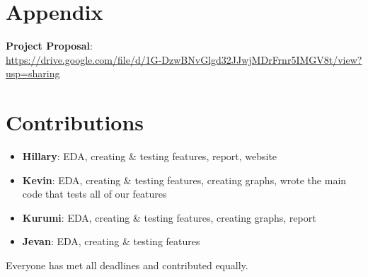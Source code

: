 \documentclass[12pt,letterpaper]{article}
\begin{document}
\clearpage

\makereference



\cite{plawiak2020dghnl}
\cite{radford2019gpt2}
\cite{vaswani2023attention}

\clearpage
\section{Appendix}

\begin{center}
\textbf{Project Proposal}: \\
\url{https://drive.google.com/file/d/1G-DzwBNvGlgd32JJwjMDrFrnr5IMGV8t/view?usp=sharing}
\end{center}


\section{Contributions}
\begin{itemize}
    \item \textbf{Hillary}: EDA, creating \& testing features, report, website
    \item \textbf{Kevin}: EDA, creating \& testing features, creating graphs, wrote the main code that tests all of our features
    \item \textbf{Kurumi}: EDA, creating \& testing features, creating graphs, report
    \item \textbf{Jevan}: EDA, creating \& testing features
\end{itemize}

Everyone has met all deadlines and contributed equally.
\end{document}
